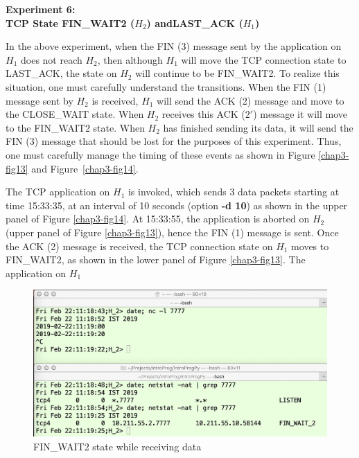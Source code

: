 \begin{multicols}{2}
\noindent
\textbf{Experiment 6:\\ TCP State FIN\_WAIT2 (\boldmath$H_{2}$) and\hfill\break LAST\_ACK ($H_{1}$)}

In the above experiment, when the FIN (3) message sent by the application on $H_{1}$ does not reach $H_{2}$, then although $H_{1}$ will move the TCP connection state to LAST\_ACK, the state on $H_{2}$ will continue to be FIN\_WAIT2. To realize this situation, one must carefully understand the transitions. When the FIN (1) message sent by $H_{2}$ is received, $H_{1}$ will send the ACK (2) message and move to the CLOSE\_WAIT state. When $H_{2}$ receives this ACK ($2'$) message it will move to the FIN\_WAIT2 state. When $H_{2}$ has finished sending its data, it will send the FIN (3) message that should be lost for the purposes of this experiment. Thus, one must carefully manage the timing of these events as shown in  Figure \ref{chap3-fig13} and Figure~\ref{chap3-fig14}.

{\parfillskip=0pt
The TCP application on $H_{1}$ is invoked, which sends 3 data packets starting at time 15:33:35, at an interval of 10 seconds (option \textbf{-d 10}) as shown in the upper panel of Figure \ref{chap3-fig14}. At 15:33:55, the application is aborted on $H_{2}$ (upper panel of Figure \ref{chap3-fig13}), hence the FIN (1) message is sent. Once the ACK (2) message is received, the TCP connection state on $H_{1}$ moves to FIN\_WAIT2, as shown in the lower panel of Figure \ref{chap3-fig13}. The application on $H_{1}$\par}
\end{multicols}

\begin{figure}[!htb]
\centering
\includegraphics[scale=.23]{src/Figures/chap3/11.jpg}
\caption{FIN\_WAIT2 state while receiving data}\label{chap3-fig11}
\end{figure}

